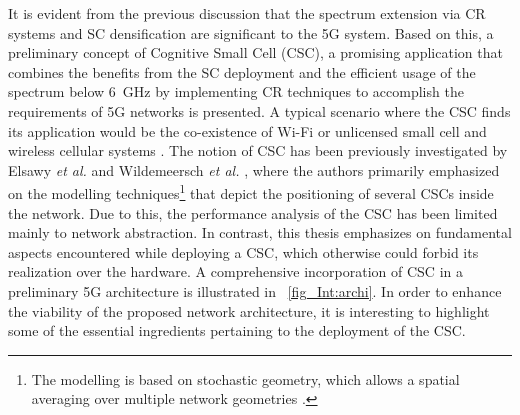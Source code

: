 It is evident from the previous discussion that the spectrum extension via CR systems and SC densification are significant to the 5G system. %
Based on this, a preliminary concept of Cognitive Small Cell (CSC), a promising application that combines the benefits from the SC deployment and the efficient usage of the spectrum below \SI{6}{GHz} by implementing CR techniques to accomplish the requirements of 5G networks is presented. A typical scenario where the CSC finds its application would be the co-existence of Wi-Fi or unlicensed small cell and wireless cellular systems \cite{Benn13, Gali15}. The notion of CSC has been previously investigated by Elsawy \textit{et al.} \cite{Elsawy13, Elsawy13_cmag} and Wildemeersch \textit{et al.} \cite{Wild13}, where the authors primarily emphasized on the modelling techniques\footnote{The modelling is based on stochastic geometry, which allows a spatial averaging over multiple network geometries \cite{Haenggi, Haenggi08now}.} that depict the positioning of several CSCs inside the network. Due to this, the performance analysis of the CSC has been limited mainly to network abstraction. In contrast, this thesis emphasizes on fundamental aspects encountered while deploying a CSC, which otherwise could forbid its realization over the hardware. %
 A comprehensive incorporation of CSC in a preliminary 5G architecture is illustrated in \figurename~\ref{fig_Int:archi}. In order to enhance the viability of the proposed network architecture, it is interesting to highlight some of the essential ingredients pertaining to the deployment of the CSC.

